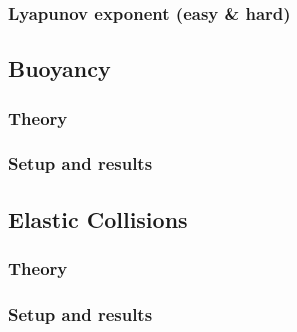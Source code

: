 \documentclass{article}
\begin{document}
\subsubsection{Lyapunov exponent (easy \& hard)}


\newpage

\subsection{Buoyancy}
\subsubsection{Theory}
\subsubsection{Setup and results}

\newpage

\subsection{Elastic Collisions}
\subsubsection{Theory}
\subsubsection{Setup and results}


\end{document}
